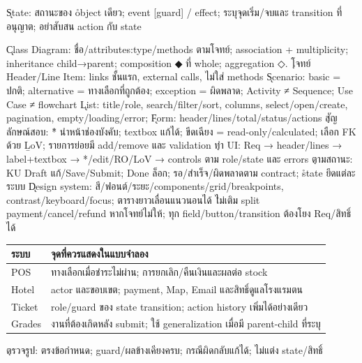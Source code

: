 \k{State}: สถานะของ \r{object เดียว}; event [guard] / effect; ระบุจุดเริ่ม/จบและ transition ที่อนุญาต; อย่าสับสน action กับ state
\begin{center}\end{center}
\k{Class Diagram}: ชื่อ/attributes:type/methods ตามโจทย์; association + multiplicity; inheritance child→parent; composition ◆ ที่ whole; aggregation ◇. \k{โจทย์ Header/Line Item}: links ชั้นแรก, external calls, ไม่ใส่ methods
\k{Scenario}: basic = ปกติ; alternative = ทางเลือกที่ถูกต้อง; exception = ผิดพลาด; Activity ≠ Sequence; Use Case ≠ flowchart
\k{List}: title/role, search/filter/sort, columns, select/open/create, pagination, empty/loading/error; \k{Form}: header/lines/total/status/actions
\k{สัญลักษณ์สอบ}: \r{*} นำหน้าช่องบังคับ; textbox แก้ได้; ขีดเฉียง = read-only/calculated; เลือก FK ด้วย \b{LoV}; รายการย่อยมี add/remove และ validation
\k{ทำ UI}: Req → header/lines → label+textbox → */edit/RO/LoV → controls ตาม role/state และ errors
\k{ตามสถานะ}: KU Draft แก้/Save/Submit; Done ล็อก; รอ/สำเร็จ/ผิดพลาดตาม contract; \r{state ยึดแต่ละระบบ}
\k{Design system}: สี/ฟอนต์/ระยะ/components/grid/breakpoints, contrast/keyboard/focus; ตารางยาวเลื่อนแนวนอนได้
\r{ไม่เติม split payment/cancel/refund หากโจทย์ไม่ให้}; ทุก field/button/transition ต้องโยง Req/สิทธิ์ได้
{\smalltable\begin{tabularx}{\linewidth}{|p{8mm}|Y|}\hline
{}ระบบ & จุดที่ควรแสดงในแบบจำลอง\\\hline
POS & ทางเลือกเมื่อชำระไม่ผ่าน; การยกเลิก/คืนเงินและผลต่อ stock\\\hline
Hotel & actor และขอบเขต; payment, Map, Email และสิทธิ์ดูแลโรงแรมตน\\\hline
Ticket & role/guard ของ state transition; action history เพิ่มได้อย่างเดียว\\\hline
Grades & งานที่ต้องเกิดหลัง submit; ใช้ generalization เมื่อมี parent-child ที่ระบุ\\\hline
\end{tabularx}}
\k{ตรวจรูป}: ตรงข้อกำหนด; guard/ผลข้างเคียงครบ; กรณีผิดกลับแก้ได้; ไม่แต่ง state/สิทธิ์
